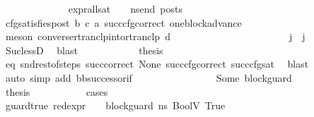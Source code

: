 \begin{isabellebody}
\ \ \ \ \ \ \ \ \ \ \ \ \isamarkupfalse%
\ {\isachardoublequoteopen}{\isacharparenleft}{\kern0pt}expr{\isacharunderscore}{\kern0pt}all{\isacharunderscore}{\kern0pt}sat\ {\isasymLambda}\ {\isasymGamma}\ {\isasymOmega}\ ns{\isacharunderscore}{\kern0pt}end{\isacharparenright}{\kern0pt}\ posts{\isachardoublequoteclose}\ \isamarkupfalse%
\ cfg{\isacharunderscore}{\kern0pt}satisfies{\isacharunderscore}{\kern0pt}post\ b\ c\ a\ succ{\isacharunderscore}{\kern0pt}cfg{\isacharunderscore}{\kern0pt}correct\ one{\isacharunderscore}{\kern0pt}block{\isacharunderscore}{\kern0pt}advance\ \isanewline
\ \ \ \ \ \ \ \ \ \ \ \ \ \ \isamarkupfalse%
\ {\isacharparenleft}{\kern0pt}meson\ converse{\isacharunderscore}{\kern0pt}rtranclp{\isacharunderscore}{\kern0pt}into{\isacharunderscore}{\kern0pt}rtranclp\ d{\isacharparenright}{\kern0pt}\ \isanewline
\ \ \ \ \ \ \ \ \ \ \isamarkupfalse%
\isanewline
\isanewline
\ \ \ \ \ \ \ \ \ \ \isamarkupfalse%
\ {\isachardoublequoteopen}j{\isacharprime}{\kern0pt}\ {\isacharless}{\kern0pt}\ j{\isachardoublequoteclose}\ \isamarkupfalse%
\ {}\ \isamarkupfalse%
\ Suc{\isacharunderscore}{\kern0pt}lessD\ \isamarkupfalse%
\ blast\isanewline
\isanewline
\ \ \ \ \ \ \ \ \ \ \isamarkupfalse%
\ {\isacharquery}{\kern0pt}thesis\ \isamarkupfalse%
\ eq\ snd{\isacharunderscore}{\kern0pt}rest{\isacharunderscore}{\kern0pt}of{\isacharunderscore}{\kern0pt}steps\ succ{\isacharunderscore}{\kern0pt}correct\ None\ succ{\isacharunderscore}{\kern0pt}cfg{\isacharunderscore}{\kern0pt}correct\ succ{\isacharunderscore}{\kern0pt}cfg{\isacharunderscore}{\kern0pt}sat\ \isamarkupfalse%
\ blast\isanewline
\ \ \ \ \ \ \ \ \isamarkupfalse%
\ {\isacharparenleft}{\kern0pt}auto\ simp\ add{\isacharcolon}{\kern0pt}\ bb{\isacharunderscore}{\kern0pt}successor{\isacharunderscore}{\kern0pt}if{\isacharparenright}{\kern0pt}\isanewline
\ \ \ \ \ \ \isamarkupfalse%
\isanewline
\ \ \ \ \ \ \ \ \isamarkupfalse%
\ {\isacharparenleft}{\kern0pt}Some\ block{\isacharunderscore}{\kern0pt}guard{\isacharparenright}{\kern0pt}\isanewline
\ \ \ \ \ \ \ \ \isamarkupfalse%
\ \isamarkupfalse%
\ {\isacharquery}{\kern0pt}thesis\ \isanewline
\ \ \ \ \ \ \ \ \isamarkupfalse%
\ cases\isanewline
\ \ \ \ \ \ \ \ \ \ \isamarkupfalse%
\ guard{\isacharunderscore}{\kern0pt}true{\isacharcolon}{\kern0pt}\ {\isachardoublequoteopen}{\isacharparenleft}{\kern0pt}red{\isacharunderscore}{\kern0pt}expr\ {\isasymLambda}\ {\isasymGamma}\ {\isasymOmega}\ block{\isacharunderscore}{\kern0pt}guard\ ns{}\ {\isacharparenleft}{\kern0pt}BoolV\ True{\isacharparenright}{\kern0pt}{\isacharparenright}{\kern0pt}{\isachardoublequoteclose}\isanewline

\end{isabellebody}
